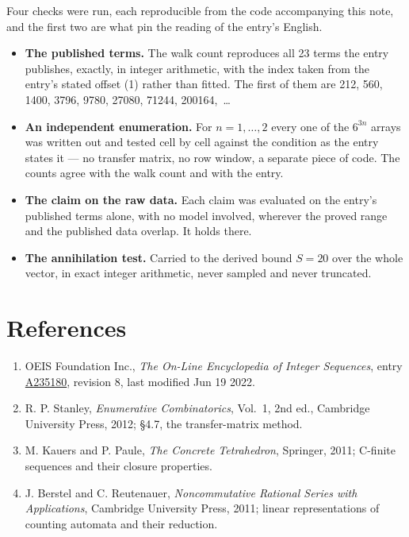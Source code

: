 \documentclass[11pt]{article}
\theoremstyle{definition}
\begin{document}
Four checks were run, each reproducible from the code accompanying this note, and the first two are what pin the reading of the entry's English.

\begin{itemize}

\item {\bfseries The published terms.} The walk count reproduces all 23 terms the entry publishes, exactly, in integer arithmetic, with the index taken from the entry's stated offset (1) rather than fitted. The first of them are 212, 560, 1400, 3796, 9780, 27080, 71244, 200164,~\dots

\item {\bfseries An independent enumeration.} For $n = 1,\dots,2$ every one of the $6^{3n}$ arrays was written out and tested cell by cell against the condition as the entry states it --- no transfer matrix, no row window, a separate piece of code. The counts agree with the walk count and with the entry.

\item {\bfseries The claim on the raw data.} Each claim was evaluated on the entry's published terms alone, with no model involved, wherever the proved range and the published data overlap. It holds there.

\item {\bfseries The annihilation test.} Carried to the derived bound $S = 20$ over the whole vector, in exact integer arithmetic, never sampled and never truncated.

\end{itemize}

\section{References}

\begin{enumerate}

\item OEIS Foundation Inc., \emph{The On-Line Encyclopedia of Integer Sequences}, entry \href{https://oeis.org/A235180}{A235180}, revision 8, last modified Jun 19 2022.

\item R. P. Stanley, \emph{Enumerative Combinatorics}, Vol.~1, 2nd ed., Cambridge University Press, 2012; \S4.7, the transfer-matrix method.

\item M. Kauers and P. Paule, \emph{The Concrete Tetrahedron}, Springer, 2011; C-finite sequences and their closure properties.

\item J. Berstel and C. Reutenauer, \emph{Noncommutative Rational Series with Applications}, Cambridge University Press, 2011; linear representations of counting automata and their reduction.

\end{enumerate}
\end{document}
